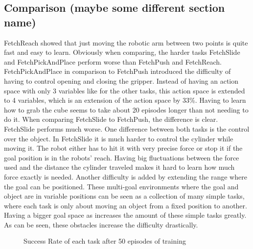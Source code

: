 
\subsection{Comparison (maybe some different section name)}

FetchReach showed that just moving the robotic arm between two points is quite fast and easy to learn.
Obviously when comparing, the harder tasks FetchSlide and FetchPickAndPlace perform worse than FetchPush and FetchReach. FetchPickAndPlace in comparison to FetchPush introduced the difficulty of having to control opening and closing the gripper. Instead of having an action space with only 3 variables like for the other tasks, this action space is extended to 4 variables, which is an extension of the action space by 33\%. Having to learn how to grab the cube seems to take about 20 episodes longer than not needing to do it. 
When comparing FetchSlide to FetchPush, the difference is clear. FetchSlide performs much worse. One difference between both tasks is the control over the object. In FetchSlide it is much harder to control the cylinder while moving it. The robot either has to hit it with very precise force or stop it if the goal position is in the robots' reach. Having big fluctuations between the force used and the distance the cylinder traveled makes it hard to learn how much force exactly is needed. 
Another difficulty is added by extending the range where the goal can be positioned. These multi-goal environments where the goal and object are in variable positions can be seen as a collection of many simple tasks, where each task is only about moving an object from a fixed position to another. Having a bigger goal space as increases the amount of these simple tasks greatly. As can be seen, these obstacles increase the difficulty drastically. 

\begin{figure} [h]
	
	\centering
	\caption{Success Rate of each task after 50 episodes of training}
	
\end{figure}


